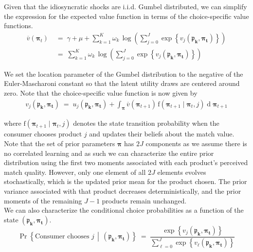 \documentclass[11pt]{article}
\begin{document}
\noindent Given that the idiosyncratic shocks are i.i.d. Gumbel distributed, we can simplify the expression for the expected value function in terms of the choice-specific value functions.
\begin{align*}
    \overline{v}(\boldsymbol{\pi}_t) \; & = \; \gamma + \mu + \sum_{k=1}^K \omega_k \, \log  \left( \sum_{j = 0}^J \exp \left\{ v_j(\mathbf{\boldsymbol{\mathfrak{p}}_k, \boldsymbol{\pi}_t}) \right\} \right) \\
    & = \;  \sum_{k=1}^K \omega_k \, \log \left( \sum_{j = 0}^J \exp \left\{ v_j(\mathbf{\boldsymbol{\mathfrak{p}}_k, \boldsymbol{\pi}_t})  \right\} \right) 
\end{align*}

\noindent 
We set the location parameter of the Gumbel distribution to the negative of the Euler-Mascharoni constant so that the latent utility draws are centered around zero. Note that the choice-specific value function is now given by
\begin{gather*}
v_j(\mathbf{\boldsymbol{\mathfrak{p}}_k, \boldsymbol{\pi}_t}) \; = \; u_j(\mathbf{\boldsymbol{\mathfrak{p}}_k, \boldsymbol{\pi}_t}) + \int_{\boldsymbol{\pi}}\overline{v}(\boldsymbol{\pi}_{t+1}) \, \text{f}\left( \boldsymbol{\pi}_{t+1} \mid \boldsymbol{\pi}_{t}, j\right) \operatorname{d}\boldsymbol{\pi}_{t+1}
\end{gather*}

\noindent where $\text{f}\left( \boldsymbol{\pi}_{t+1} \mid \boldsymbol{\pi}_{t}, j\right)$ denotes the state transition probability when the consumer chooses product $j$ and updates their beliefs about the match value. \\

\noindent Note that the set of prior parameters $\boldsymbol{\pi}$ has $2 J$ components as we assume there is no correlated learning and as such we can characterize the entire prior distribution using the first two moments associated with each product's perceived match quality. However, only one element of all $2J$ elements evolves stochastically, which is the updated prior mean for the product chosen. The prior variance associated with that product decreases deterministically, and the prior moments of the remaining $J -1$ products remain unchanged. \\

\noindent We can also characterize the conditional choice probabilities as a function of the state $(\mathbf{\boldsymbol{\mathfrak{p}}_k, \boldsymbol{\pi}_t})$.
$$
    \Pr \left\{\text{Consumer chooses } j \, \middle| \, (\mathbf{\boldsymbol{\mathfrak{p}}_k, \boldsymbol{\pi}_t}) \right\} \; = \; \frac{\exp \left\{ v_j(\mathbf{\boldsymbol{\mathfrak{p}}_k, \boldsymbol{\pi}_t})  \right\}}{\displaystyle \sum_{\ell = 0}^J \exp \left\{ v_\ell(\mathbf{\boldsymbol{\mathfrak{p}}_k, \boldsymbol{\pi}_t})  \right\}}
$$
\end{document}
